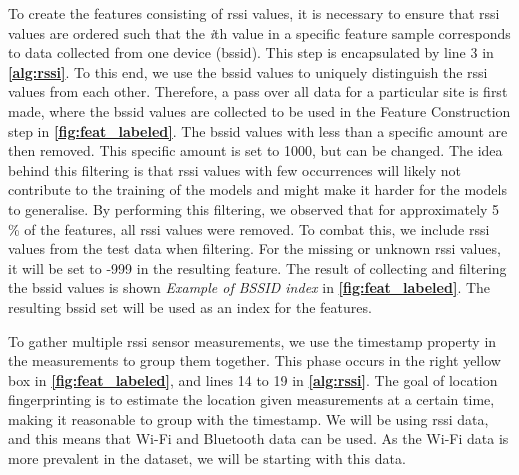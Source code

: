 To create the features consisting of \gls{rssi} values, it is necessary to ensure that \gls{rssi} values are ordered such that the \textit{i}th value in a specific feature sample corresponds to data collected from one device (\gls{bssid}). This step is encapsulated by line 3 in \textbf{\autoref{alg:rssi}}. To this end, we use the \gls{bssid} values to uniquely distinguish the \gls{rssi} values from each other. Therefore, a pass over all data for a particular site is first made, where the \gls{bssid} values are collected to be used in the Feature Construction step in \textbf{\autoref{fig:feat_labeled}}. The \gls{bssid} values with less than a specific amount are then removed. This specific amount is set to 1000, but can be changed. The idea behind this filtering is that \gls{rssi} values with few occurrences will likely not contribute to the training of the models and might make it harder for the models to generalise. By performing this filtering, we observed that for approximately 5 \% of the features, all \gls{rssi} values were removed. To combat this, we include \gls{rssi} values from the test data when filtering. For the missing or unknown \gls{rssi} values, it will be set to -999 in the resulting feature. The result of collecting and filtering the \gls{bssid} values is shown \textit{Example of BSSID index} in \textbf{\autoref{fig:feat_labeled}}. 
The resulting \gls{bssid} set will be used as an index for the features. %

To gather multiple \gls{rssi} sensor measurements, we use the timestamp property in the measurements to group them together. This phase occurs in the right yellow box in \textbf{\autoref{fig:feat_labeled}}, and lines 14 to 19 in \textbf{\autoref{alg:rssi}}. The goal of location fingerprinting is to estimate the location given measurements at a certain time, making it reasonable to group with the timestamp. We will be using \gls{rssi} data, and this means that Wi-Fi and Bluetooth data can be used. As the Wi-Fi data is more prevalent in the dataset, we will be starting with this data. 

